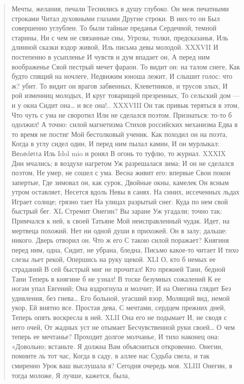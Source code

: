 \begin{verse}
Мечты, желания, печали
Теснились в душу глубоко.
Он меж печатными строками
Читал духовными глазами
Другие строки. В них-то он
Был совершенно углублен.
То были тайные преданья
Сердечной, темной старины,
Ни с чем не связанные сны,
Угрозы, толки, предсказанья,
Иль длинной сказки вздор живой,
Иль письма девы молодой.
XXXVII
И постепенно в усыпленье
И чувств и дум впадает он,
А перед ним воображенье
Свой пестрый мечет фараон.
То видит он: на талом снеге,
Как будто спящий на ночлеге,
Недвижим юноша лежит,
И слышит голос: что ж? убит.
То видит он врагов забвенных,
Клеветников, и трусов злых,
И рой изменниц молодых,
И круг товарищей презренных,
То сельский дом — и у окна
Сидит она… и все она!..
XXXVIII
Он так привык теряться в этом,
Что чуть с ума не своротил
Или не сделался поэтом.
Признаться: то-то б одолжил!
А точно: силой магнетизма
Стихов российских механизма
Едва в то время не постиг
Мой бестолковый ученик.
Как походил он на поэта,
Когда в углу сидел один,
И перед ним пылал камин,
И он мурлыкал: Веnеdеttа
Иль Idol mio и ронял
В огонь то туфлю, то журнал.
XXXIX
Дни мчались; в воздухе нагретом
Уж разрешалася зима;
И он не сделался поэтом,
Не умер, не сошел с ума.
Весна живит его: впервые
Свои покои запертые,
Где зимовал он, как сурок,
Двойные окны, камелек
Он ясным утром оставляет,
Несется вдоль Невы в санях.
На синих, иссеченных льдах
Играет солнце; грязно тает
На улицах разрытый снег.
Куда по нем свой быстрый бег.
ХL
Стремит Онегин? Вы заране
Уж угадали; точно так:
Примчался к ней, к своей Татьяне
Мой неисправленный чудак.
Идет, на мертвеца похожий.
Нет ни одной души в прихожей.
Он в залу; дальше: никого.
Дверь отворил он. Что ж его
С такою силой поражает?
Княгиня перед ним, одна,
Сидит, не убрана, бледна,
Письмо какое-то читает
И тихо слезы льет рекой,
Опершись на руку щекой.
ХLI
О, кто б немых ее страданий
В сей быстрый миг не прочитал!
Кто прежней Тани, бедной Тани
Теперь в княгине б не узнал!
В тоске безумных сожалений
К ее ногам упал Евгений;
Она вздрогнула и молчит;
И на Онегина глядит
Без удивления, без гнева…
Его больной, угасший взор,
Молящий вид, немой укор,
Ей внятно все. Простая дева,
С мечтами, сердцем прежних дней,
Теперь опять воскресла в ней.
XLII
Она его не подымает
И, не сводя с него очей,
От жадных уст не отымает
Бесчувственной руки своей…
О чем теперь ее мечтанье?
Проходит долгое молчанье,
И тихо наконец она:
«Довольно; встаньте. Я должна
Вам объясниться откровенно.
Онегин, помните ль тот час,
Когда в саду, в аллее нас
Судьба свела, и так смиренно
Урок ваш выслушала я?
Сегодня очередь моя.
XLIII
Онегин, я тогда моложе,
Я лучше, кажется, была,

\end{verse}
